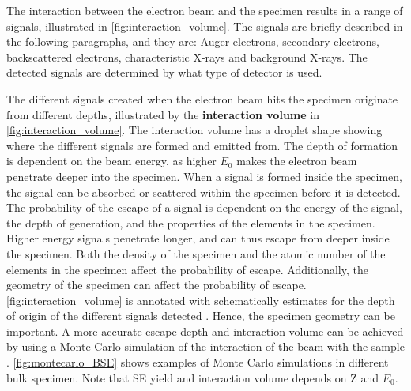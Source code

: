 The interaction between the electron beam and the specimen results in a range of signals, illustrated in \cref{fig:interaction_volume}.
The signals are briefly described in the following paragraphs, and they are: Auger electrons, secondary electrons, backscattered electrons, characteristic X-rays and background X-rays.
The detected signals are determined by what type of detector is used.



The different signals created when the electron beam hits the specimen originate from different depths, illustrated by the \textbf{interaction volume} in \cref{fig:interaction_volume}.
The interaction volume has a droplet shape showing where the different signals are formed and emitted from.
The depth of formation is dependent on the beam energy, as higher $E_0$ makes the electron beam penetrate deeper into the specimen.
When a signal is formed inside the specimen, the signal can be absorbed or scattered within the specimen before it is detected.
The probability of the escape of a signal is dependent on the energy of the signal, the depth of generation, and the properties of the elements in the specimen.
Higher energy signals penetrate longer, and can thus escape from deeper inside the specimen.
Both the density of the specimen and the atomic number of the elements in the specimen affect the probability of escape.
Additionally, the geometry of the specimen can affect the probability of escape.
\cref{fig:interaction_volume} is annotated with schematically estimates for the depth of origin of the different signals detected \cite{goldstein_scanning_2018,hollas_modern_2004}.
Hence, the specimen geometry can be important.
A more accurate escape depth and interaction volume can be achieved by using a Monte Carlo simulation of the interaction of the beam with the sample \cite[Ch. 4.3.4]{goldstein_scanning_2018}.
\cref{fig:montecarlo_BSE} shows examples of Monte Carlo simulations in different bulk specimen.
Note that SE yield and interaction volume depends on Z and $E_0$.


